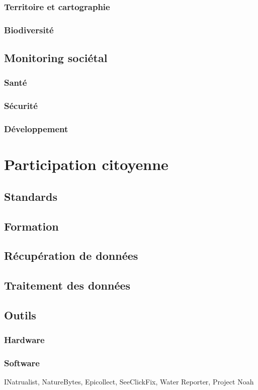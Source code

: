 \documentclass[10pt, conference, compsocconf]{llncs}
\begin{document}
		\subsubsection{Territoire et cartographie}
		\subsubsection{Biodiversité}
	
	\subsection{Monitoring sociétal}
		\subsubsection{Santé}
		\subsubsection{Sécurité}
		\subsubsection{Développement}
		
\section{Participation citoyenne}
	\subsection{Standards}
	\subsection{Formation}
	\subsection{Récupération de données}
	\subsection{Traitement des données}
	\subsection{Outils}
		\subsubsection{Hardware}
		\subsubsection{Software}
		INatrualist, NatureBytes, Epicollect, SeeClickFix, Water Reporter, Project Noah		
\end{document}
